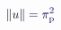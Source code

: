 \documentclass[12pt]{article}
\begin{document}
\makeatletter
\renewcommand*{\@textcolor}[3]{%
  \protect\leavevmode
  \begingroup
    \color#1{#2}#3%
  \endgroup
}
\makeatother
\begin{displaymath}
\mathcolor[RGB]{0,0,15}{\|} \mathcolor[RGB]{0,0,30}{u} \mathcolor[RGB]{0,0,45}{\|} \mathcolor[RGB]{0,0,60}{=} \mathcolor[RGB]{0,0,75}{\pi} _ { \mathrm { \mathcolor[RGB]{0,0,90}{p} } } ^ { \mathcolor[RGB]{0,0,105}{2} }
\end{displaymath}
\end{document}
